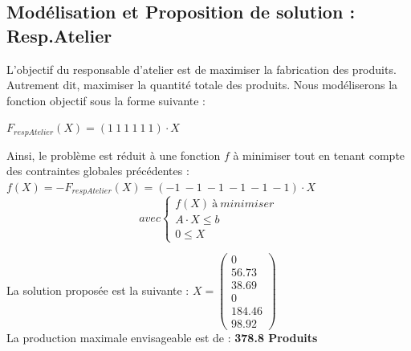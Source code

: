 \documentclass[a4paper, 11pt]{article}
\begin{document}
\subsection{Modélisation et Proposition de solution : Resp.Atelier}
L'objectif du responsable d'atelier est de maximiser la fabrication des produits. Autrement dit, maximiser la quantité totale des produits. 
Nous modéliserons la fonction objectif sous la forme suivante :
\begin{center}
$F_{respAtelier} (X) =(1~1~1~1~1~1)\cdot X$ \\
\end{center}
Ainsi, le problème est réduit à une fonction $f$ à minimiser tout en tenant compte des contraintes globales précédentes :
$f(X) = -F_{respAtelier} (X) =(-1~-1~-1~-1~-1~-1)\cdot X$ \\
$$
avec \left\{\begin{split}
	f(X)\ à\ minimiser\\
    A\cdot X \leq b\\
    0 \leq X
\end{split}\right.
$$

La solution proposée est la suivante :
$ X =\begin{pmatrix}
0\\
56.73\\
38.69\\
0\\
184.46\\
98.92
\end{pmatrix} $\\
La production maximale envisageable est de : \textbf{378.8 Produits}
\end{document}
